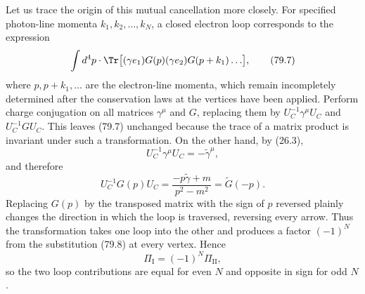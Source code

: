 Let us trace the origin of this mutual cancellation more closely. For specified photon-line momenta $k_1,k_2,\ldots,k_N$, a closed electron loop corresponds to the expression
\begin{equation}
\int d^4p\cdot\Tr\bigl[(\gamma e_1)G(p)(\gamma e_2)G(p+k_1)\ldots\bigr],
\tag{79.7}
\end{equation}
where $p,p+k_1,\ldots$ are the electron-line momenta, which remain incompletely determined after the conservation laws at the vertices have been applied. Perform charge conjugation on all matrices $\gamma^\mu$ and $G$, replacing them by $U_C^{-1}\gamma^\mu U_C$ and $U_C^{-1}GU_C$. This leaves (79.7) unchanged because the trace of a matrix product is invariant under such a transformation. On the other hand, by (26.3),
\begin{equation}
U_C^{-1}\gamma^\mu U_C=-\widetilde\gamma^\mu,
\tag{79.8}
\end{equation}
and therefore
\begin{equation}
U_C^{-1}G(p)U_C
=\frac{-p\widetilde\gamma+m}{p^2-m^2}
=\widetilde G(-p).
\tag{79.9}
\end{equation}
Replacing $G(p)$ by the transposed matrix with the sign of $p$ reversed plainly changes the direction in which the loop is traversed, reversing every arrow. Thus the transformation takes one loop into the other and produces a factor $(-1)^N$ from the substitution (79.8) at every vertex. Hence
\begin{equation}
\Pi_{\mathrm I}=(-1)^N\Pi_{\mathrm{II}},
\tag{79.10}
\end{equation}
so the two loop contributions are equal for even $N$ and opposite in sign for odd $N$.

